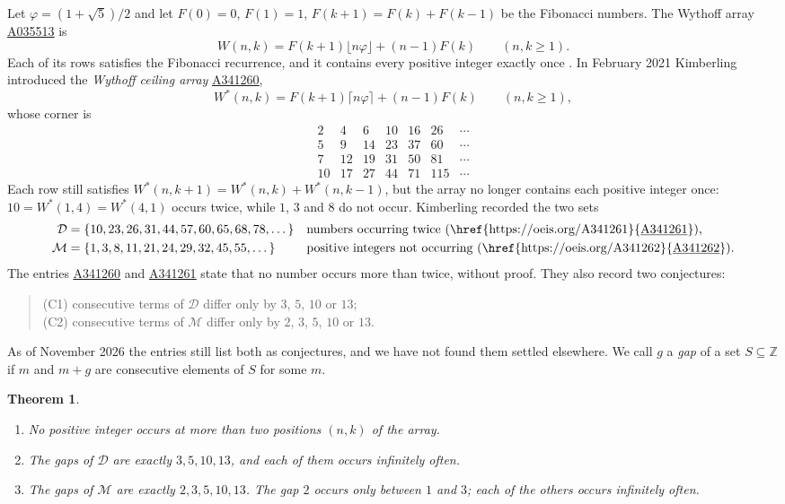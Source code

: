 \documentclass[12pt]{article}
\newcommand{\seqnum}[1]{\href{https://oeis.org/#1}{\underline{#1}}}
\newcommand{\fl}[1]{\lfloor #1 \rfloor}
\newcommand{\cl}[1]{\lceil #1 \rceil}
\newcommand{\Z}{\mathbb{Z}}
\newcommand{\D}{\mathcal{D}}
\newcommand{\M}{\mathcal{M}}
\newcommand{\Ws}{W^{*}}
\theoremstyle{plain}
\newtheorem{theorem}{Theorem}
\theoremstyle{remark}
\begin{document}
Let $\varphi=(1+\sqrt5)/2$ and let $F(0)=0$, $F(1)=1$, $F(k+1)=F(k)+F(k-1)$ be the Fibonacci
numbers. The Wythoff array \seqnum{A035513} is
\[
W(n,k)=F(k+1)\fl{n\varphi}+(n-1)F(k)\qquad(n,k\ge1).
\]
Each of its rows satisfies the Fibonacci recurrence, and it contains every positive integer
exactly once \cite{morrison,kimberling95}. In February 2021 Kimberling \cite{oeis} introduced
the \emph{Wythoff ceiling array} \seqnum{A341260},
\[
\Ws(n,k)=F(k+1)\cl{n\varphi}+(n-1)F(k)\qquad(n,k\ge1),
\]
whose corner is
\[
\begin{array}{rrrrrrr}
2&4&6&10&16&26&\cdots\\
5&9&14&23&37&60&\cdots\\
7&12&19&31&50&81&\cdots\\
10&17&27&44&71&115&\cdots
\end{array}
\]
Each row still satisfies $\Ws(n,k+1)=\Ws(n,k)+\Ws(n,k-1)$, but the array no longer contains
each positive integer once: $10=\Ws(1,4)=\Ws(4,1)$ occurs twice, while $1$, $3$ and $8$ do not
occur. Kimberling recorded the two sets
\begin{align*}
\D&=\{10,23,26,31,44,57,60,65,68,78,\dots\}&&\text{numbers occurring twice (\seqnum{A341261}),}\\
\M&=\{1,3,8,11,21,24,29,32,45,55,\dots\}&&\text{positive integers not occurring (\seqnum{A341262}).}
\end{align*}
The entries \seqnum{A341260} and \seqnum{A341261} state that no number occurs more than twice,
without proof. They also record two conjectures:
\begin{quote}
(C1) consecutive terms of $\D$ differ only by $3$, $5$, $10$ or $13$;\\
(C2) consecutive terms of $\M$ differ only by $2$, $3$, $5$, $10$ or $13$.
\end{quote}
As of November 2026 the entries still list both as conjectures, and we have not found them
settled elsewhere. We call $g$ a \emph{gap} of a set $S\subseteq\Z$ if $m$ and $m+g$ are
consecutive elements of $S$ for some $m$.

\begin{theorem}\label{thm:main}
\leavevmode
\begin{enumerate}
\item[(a)] No positive integer occurs at more than two positions $(n,k)$ of the array.
\item[(b)] The gaps of $\D$ are exactly $3,5,10,13$, and each of them occurs infinitely often.
\item[(c)] The gaps of $\M$ are exactly $2,3,5,10,13$. The gap $2$ occurs only between $1$ and
$3$; each of the others occurs infinitely often.
\end{enumerate}
\end{theorem}
\end{document}
